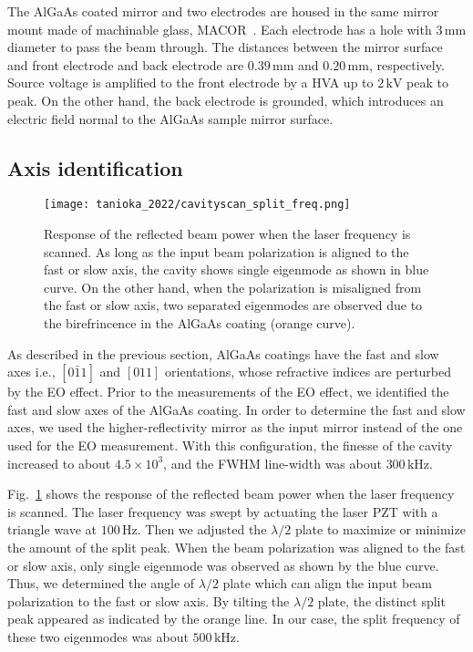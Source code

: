 The AlGaAs coated mirror and two electrodes are housed in the same mirror mount made of machinable glass, MACOR~\cite{macor}.
Each electrode has a hole with $3\, \mathrm{mm}$ diameter to pass the beam through.
The distances between the mirror surface and front electrode and back electrode are $0.39\, \mathrm{mm}$ and $0.20\, \mathrm{mm}$, respectively.
Source voltage is amplified to the front electrode by a HVA up to $2\, \mathrm{kV}$ peak to peak.
On the other hand, the back electrode is grounded, which introduces an electric field normal to the AlGaAs sample mirror surface.

\subsection{Axis identification}

\begin{figure}[H]
    \centering
\texttt{[image: tanioka\_2022/cavityscan\_split\_freq.png]}
\caption{
Response of the reflected beam power when the laser frequency is scanned.
As long as the input beam polarization is aligned to the fast or slow axis, the cavity shows single eigenmode as shown in blue curve.
On the other hand, when the polarization is misaligned from the fast or slow axis, two separated eigenmodes are observed due to the birefrincence in the AlGaAs coating (orange curve).
}
\label{fig.split}
\end{figure}

As described in the previous section, AlGaAs coatings have the fast and slow axes i.e., $[0\bar{1}1]$ and $[011]$ orientations, whose refractive indices are perturbed by the EO effect.
Prior to the measurements of the EO effect, we identified the fast and slow axes of the AlGaAs coating.
In order to determine the fast and slow axes, we used the higher-reflectivity mirror as the input mirror instead of the one used for the EO measurement.
With this configuration, the finesse of the cavity increased to about $4.5\times10^3$, and the FWHM line-width was about $300\, \mathrm{kHz}$.

Fig.~\ref{fig.split} shows the response of the reflected beam power when the laser frequency is scanned.
The laser frequency was swept by actuating the laser PZT with a triangle wave at $100\, \mathrm{Hz}$.
Then we adjusted the $\lambda/2$ plate to maximize or minimize the amount of the split peak.
When the beam polarization was aligned to the fast or slow axis, only single eigenmode was observed as shown by the blue curve.
Thus, we determined the angle of $\lambda/2$ plate which can align the input beam polarization to the fast or slow axis.
By tilting the $\lambda/2$ plate, the distinct split peak appeared as indicated by the orange line.
In our case, the split frequency of these two eigenmodes was about $500\, \mathrm{kHz}$.

